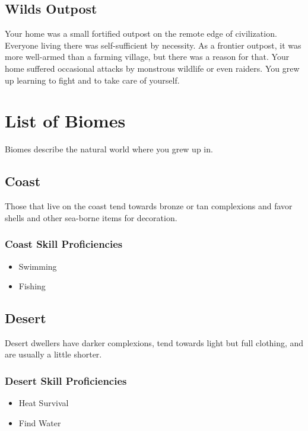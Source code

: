 \begin{multicols}{2}
\subsection{Wilds Outpost}

Your home was a small fortified outpost on the remote edge of civilization.
Everyone living there was self-sufficient by necessity. As a frontier
outpost, it was more well-armed than a farming village, but there was a
reason for that. Your home suffered occasional attacks by monstrous
wildlife or even raiders. You grew up learning to fight and to take
care of yourself.

\section{List of Biomes}

Biomes describe the natural world where you grew up in. 

\subsection{Coast}

Those that live on the coast tend towards bronze or tan complexions
and favor shells and other sea-borne items for decoration.

\subsubsection{Coast Skill Proficiencies}

\begin{itemize}
  \item Swimming
  \item Fishing
\end{itemize}

\subsection{Desert}

Desert dwellers have darker complexions, tend towards light but full
clothing, and are usually a little shorter.

\subsubsection{Desert Skill Proficiencies}

\begin{itemize}
  \item Heat Survival
  \item Find Water
\end{itemize}


\end{multicols}
